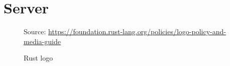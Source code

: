 \section{Server}
\label{subsec:conclusions_limitations_and_future_works_server}

\begin{figure} %
  \centering
  \def\stackalignment{r} %
  {\scriptsize \parbox[t]{\linewidth}{ Source: \url{https://foundation.rust-lang.org/policies/logo-policy-and-media-guide}} }
  \caption{Rust logo}
\end{figure}

